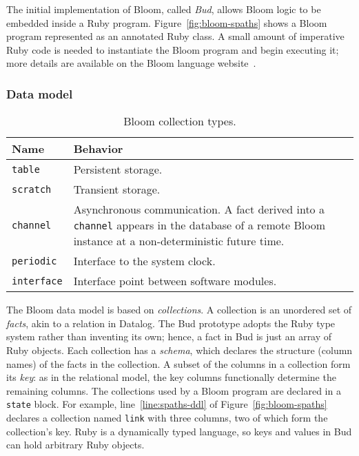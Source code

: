 The initial implementation of Bloom, called \emph{Bud}, allows Bloom logic to be
embedded inside a Ruby program. Figure~\ref{fig:bloom-spaths} shows a Bloom
program represented as an annotated Ruby class. A small amount of imperative
Ruby code is needed to instantiate the Bloom program and begin executing it;
more details are available on the Bloom language website~\cite{bloom}.

\subsubsection{Data model}
\begin{table}[t]
\begin{tabular}{|l|p{2.32in}|}
\hline
\textbf{Name} & \textbf{Behavior }\\
\hline
\texttt{table} & Persistent storage.\\
\texttt{scratch} & Transient storage.\\
\texttt{channel} & Asynchronous communication. A fact derived into a \texttt{channel} appears in the
database of a remote Bloom instance at a non-deterministic future time.\\
\texttt{periodic} & Interface to the system clock.\\
\texttt{interface} & Interface point between software modules.\\
\hline
\end{tabular}
\caption{Bloom collection types.}
\label{tbl:bloom-collections}
\end{table}

The Bloom data model is based on \emph{collections}.  A collection is an
unordered set of \emph{facts}, akin to a relation in Datalog. The Bud prototype
adopts the Ruby type system rather than inventing its own; hence, a fact in Bud
is just an array of Ruby objects. Each collection has a \emph{schema}, which
declares the structure (column names) of the facts in the collection. A subset
of the columns in a collection form its \emph{key}: as in the relational model,
the key columns functionally determine the remaining columns. The collections
used by a Bloom program are declared in a \texttt{state} block. For example,
line~\ref{line:spaths-ddl} of Figure~\ref{fig:bloom-spaths} declares a
collection named \texttt{link} with three columns, two of which form the
collection's key. Ruby is a dynamically typed language, so keys and values in
Bud can hold arbitrary Ruby objects.

